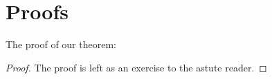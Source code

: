 \documentclass{scrartcl}  %
\begin{document}


\appendix

\section*{Proofs}

The proof of our theorem:
\begin{proof}
  The proof is left as an exercise to the astute reader.
\end{proof}
\end{document}
